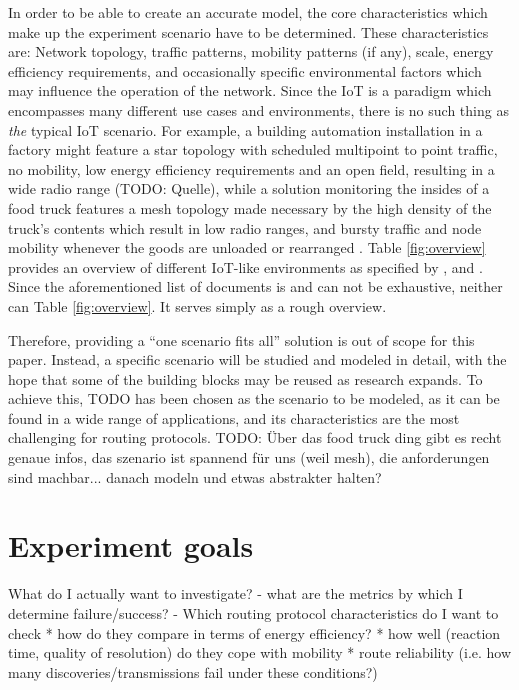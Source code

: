 \documentclass{acm_proc_article-sp}
\begin{document}
In order to be able to create an accurate model, the core characteristics which make up the experiment scenario have to be determined. These characteristics are: Network topology, traffic patterns, mobility patterns (if any), scale, energy efficiency requirements, and occasionally specific environmental factors which may influence the operation of the network.
Since the IoT is a paradigm which encompasses many different use cases and environments, there is no such thing as \emph{the} typical IoT scenario. For example, a building automation installation in a factory might feature a star topology with scheduled multipoint to point traffic, no mobility, low energy efficiency requirements and an open field, resulting in a wide radio range (TODO: Quelle), while a solution monitoring the insides of a food truck features a mesh topology made necessary by the high density of the truck's contents which result in low radio ranges, and bursty traffic and node mobility whenever the goods are unloaded or rearranged \cite{food_monitoring}.
Table \ref{fig:overview} provides an overview of different IoT-like environments as specified by \cite{RFC-5826}, \cite{RFC-5867} and \cite{RFC-5548}. Since the aforementioned list of documents is and can not be exhaustive, neither can Table \ref{fig:overview}. It serves simply as a rough overview.

Therefore, providing a ``one scenario fits all'' solution is out of scope for this paper. Instead, a specific scenario will be studied and modeled in detail, with the hope that some of the building blocks may be reused as research expands.
To achieve this, TODO has been chosen as the scenario to be modeled, as it can be found in a wide range of applications, and its characteristics are the most challenging for routing protocols.
TODO: Über das food truck ding gibt es recht genaue infos, das szenario ist spannend für uns (weil mesh), die anforderungen sind machbar... danach modeln und etwas abstrakter halten?

\section{Experiment goals}
\label{sec:Goals}
What do I actually want to investigate?
- what are the metrics by which I determine failure/success?
- Which routing protocol characteristics do I want to check
    * how do they compare in terms of energy efficiency?
    * how well (reaction time, quality of resolution) do they cope with mobility
    * route reliability (i.e. how many discoveries/transmissions fail under these conditions?)
\end{document}
